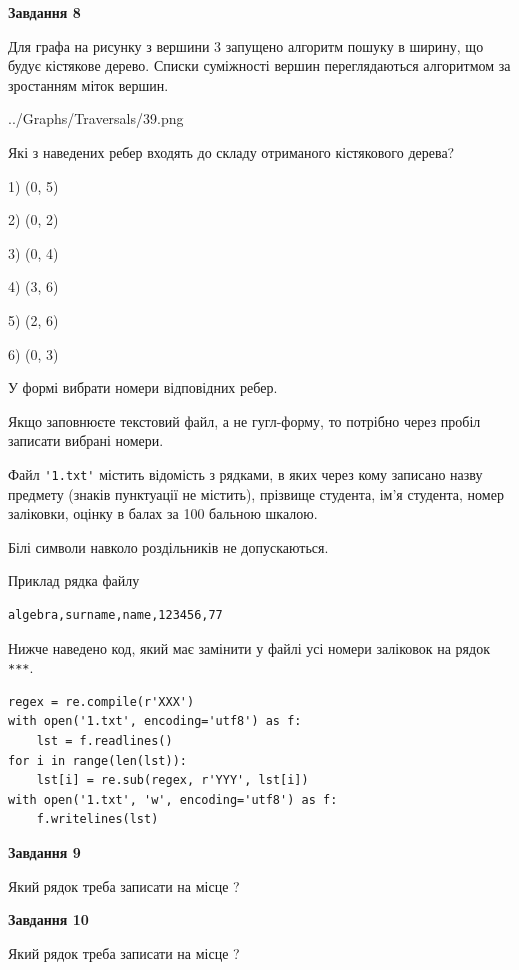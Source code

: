 \documentclass[12pt, ukrainian]{article}
\def\code#1{\Verb!#1!}
\begin{document}
{\begin {large}
{\begin {center}\textbf{Завдання 8}\end {center}}\par
Для графа на рисунку з вершини 3 запущено алгоритм пошуку в ширину, що будує кістякове дерево. Списки суміжності вершин переглядаються алгоритмом за зростанням міток вершин.\par
\begin{center}
	{../Graphs/Traversals/39.png}
\end{center}
\par Які з наведених ребер входять до складу отриманого кістякового дерева?\par
1) (0, 5)\par
2) (0, 2)\par
3) (0, 4)\par
4) (3, 6)\par
5) (2, 6)\par
6) (0, 3)\par
{\vskip 15pt} У формі вибрати номери відповідних ребер.


Якщо заповнюєте текстовий файл, а не гугл-форму, то потрібно через пробіл записа\-ти вибрані номери.\par
\newpage


Файл \code{'1.txt'} містить відомість з рядками, в яких через кому записа\-но назву предмету (знаків пунктуації не містить), прізвище студента, ім'я студента, номер залі\-ков\-ки, оцінку в балах за 100 бальною шкалою.

Білі символи навколо роздільників не допускаються.

Приклад рядка файлу



\begin{verbatim}
algebra,surname,name,123456,77
\end{verbatim}


Нижче наведено код, який має замінити у файлі усі номери заліковок на рядок \code{***}.



\begin{verbatim}
regex = re.compile(r'XXX')
with open('1.txt', encoding='utf8') as f:
    lst = f.readlines()
for i in range(len(lst)):
    lst[i] = re.sub(regex, r'YYY', lst[i])
with open('1.txt', 'w', encoding='utf8') as f:
    f.writelines(lst)
\end{verbatim}




{\begin {center}\textbf{Завдання 9}\end {center}}\par
Який рядок треба записати на місце  ?\par
\vspace{5mm}


{\begin {center}\textbf{Завдання 10}\end {center}}\par
Який рядок треба записати на місце  ?\par


\newpage


\end {large}}
\end{document}
